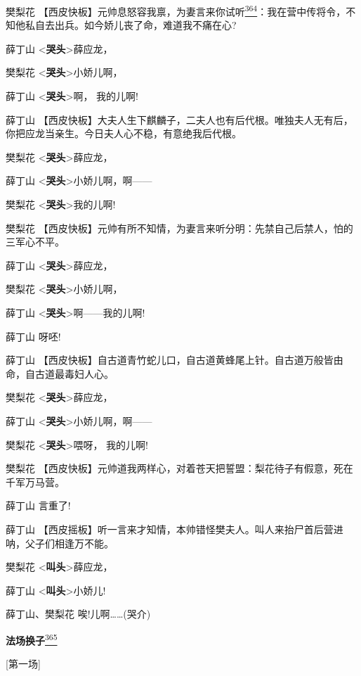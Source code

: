 樊梨花
【西皮快板】元帅息怒容我禀，为妻言来你试听\protect\hyperlink{fn364}{\textsuperscript{364}}：我在营中传将令，不知他私自去出兵。如今娇儿丧了命，难道我不痛在心?

薛丁山 \textless{}\textbf{哭头}\textgreater{}薛应龙，

樊梨花 \textless{}\textbf{哭头}\textgreater{}小娇儿啊，

薛丁山 \textless{}\textbf{哭头}\textgreater{}啊， 我的儿啊!

薛丁山
【西皮快板】大夫人生下麒麟子，二夫人也有后代根。唯独夫人无有后，你把应龙当亲生。今日夫人心不稳，有意绝我后代根。

樊梨花 \textless{}\textbf{哭头}\textgreater{}薛应龙，

薛丁山 \textless{}\textbf{哭头}\textgreater{}小娇儿啊，啊------

樊梨花 \textless{}\textbf{哭头}\textgreater{}我的儿啊!

樊梨花
【西皮快板】元帅有所不知情，为妻言来听分明：先禁自己后禁人，怕的三军心不平。

薛丁山 \textless{}\textbf{哭头}\textgreater{}薛应龙，

樊梨花 \textless{}\textbf{哭头}\textgreater{}小娇儿啊，

薛丁山 \textless{}\textbf{哭头}\textgreater{}啊------我的儿啊!

薛丁山 呀呸!

薛丁山
【西皮快板】自古道青竹蛇儿口，自古道黄蜂尾上针。自古道万般皆由命，自古道最毒妇人心。

樊梨花 \textless{}\textbf{哭头}\textgreater{}薛应龙，

薛丁山 \textless{}\textbf{哭头}\textgreater{}小娇儿啊，啊------

樊梨花 \textless{}\textbf{哭头}\textgreater{}喂呀， 我的儿啊!

樊梨花
【西皮快板】元帅道我两样心，对着苍天把誓盟：梨花待子有假意，死在千军万马营。

薛丁山 言重了!

薛丁山
【西皮摇板】听一言来才知情，本帅错怪樊夫人。叫人来抬尸首后营进呐，父子们相逢万不能。

樊梨花 \textless{}\textbf{叫头}\textgreater{}薛应龙，

薛丁山 \textless{}\textbf{叫头}\textgreater{}小娇儿!

薛丁山、樊梨花 唉!儿啊\ldots{}\ldots{}(哭介)

\textbf{法场换子}\protect\hyperlink{fn365}{\textsuperscript{365}}

{[}第一场{]}

